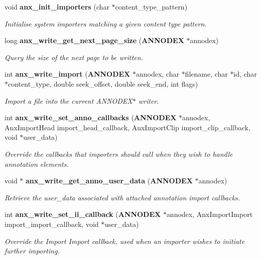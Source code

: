 \begin{CompactItemize}
\item 
void {\bf anx\_\-init\_\-importers} (char $\ast$content\_\-type\_\-pattern)
\begin{CompactList}\small\item\em Initialise system importers matching a given content type pattern. \item\end{CompactList}\item 
long {\bf anx\_\-write\_\-get\_\-next\_\-page\_\-size} ({\bf ANNODEX} $\ast$annodex)
\begin{CompactList}\small\item\em Query the size of the next page to be written. \item\end{CompactList}\item 
int {\bf anx\_\-write\_\-import} ({\bf ANNODEX} $\ast$annodex, char $\ast$filename, char $\ast$id, char $\ast$content\_\-type, double seek\_\-offset, double seek\_\-end, int flags)
\begin{CompactList}\small\item\em Import a file into the current ANNODEX$\ast$ writer. \item\end{CompactList}\item 
int {\bf anx\_\-write\_\-set\_\-anno\_\-callbacks} ({\bf ANNODEX} $\ast$annodex, Anx\-Import\-Head import\_\-head\_\-callback, Anx\-Import\-Clip import\_\-clip\_\-callback, void $\ast$user\_\-data)
\begin{CompactList}\small\item\em Override the callbacks that importers should call when they wish to handle annotation elements. \item\end{CompactList}\item 
void $\ast$ {\bf anx\_\-write\_\-get\_\-anno\_\-user\_\-data} ({\bf ANNODEX} $\ast$annodex)
\begin{CompactList}\small\item\em Retrieve the user\_\-data associated with attached annotation import callbacks. \item\end{CompactList}\item 
int {\bf anx\_\-write\_\-set\_\-ii\_\-callback} ({\bf ANNODEX} $\ast$annodex, Anx\-Import\-Import import\_\-import\_\-callback, void $\ast$user\_\-data)
\begin{CompactList}\small\item\em Override the Import Import callback, used when an importer wishes to initiate further importing. \item\end{CompactList}\item 

\end{CompactItemize}
